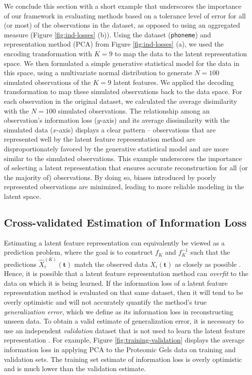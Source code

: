 We conclude this section with a short example that underscores the importance of our framework in evaluating methods based on a tolerance level of error for all (or most) of the observations in the dataset, as opposed to using an aggregated measure (Figure \ref{fig:ind-losses} (b)).
Using the dataset (\texttt{phoneme}) and representation method (PCA) from Figure \ref{fig:ind-losses} (a), we used the encoding transformation with $K=9$ to map the data to the latent representation space.
We then formulated a simple generative statistical model for the data in this space, using a multivariate normal distribution to generate $N=100$ simulated observations of the $K=9$ latent features.
We applied the decoding transformation to map these simulated observations back to the data space. For each observation in the original dataset, we calculated the average disimilarity with the $N=100$ simulated observations.
The relationship among an observation's information loss ($y$-axis) and its average dissimilarity with the simulated data ($x$-axis) displays a clear pattern -- observations that are represented well by the latent feature representation method are disproportionately favored by the generative statistical model and are more similar to the simulated observations.
This example underscores the importance of selecting a latent representation that ensures accurate reconstruction for all (or the majority of) observations. 
By doing so, biases introduced by poorly represented observations are minimized, leading to more reliable modeling in the latent space.

\subsection{Cross-validated Estimation of Information Loss}

Estimating a latent feature representation can equivalently be viewed as a prediction problem, where the goal is to construct $f_{K}$ and $f_{K}^{-1}$ such that the predictions $\widehat{X}_i^{(K)}(\mathbf{t})$ match the observed data $X_i(\mathbf{t})$ as closely as possible \parencite{krzanowski_cross-validation_1987, wold_cross-validatory_1978, diana_cross-validation_2002}.
Hence, it is possible that a latent feature representation method can \emph{overfit} to the data on which it is being learned.
If the information loss of a latent feature representation method is evaluated on that same dataset, then it will tend to be overly optimistic and will not accurately quantify the method's true \emph{generalization error}, which we define as its information loss in reconstructing unseen data.
To obtain a valid estimate of generalization error, it is necessary to use an independent \emph{validation} dataset that is not used to learn the latent feature representation \parencite{diana_cross-validation_2002}.
For example, Figure \ref{fig:training-validation} displays the average information loss in applying PCA to the Proteomic Gels data \parencite{morris_pinnacle_2008} on training and validation sets.
The training set estimate of information loss is overly optimistic and is much lower than the validation estimate.


